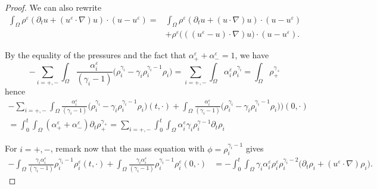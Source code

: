 \documentclass[11pt, twoside, a4paper]{article}
\theoremstyle{plain}
\theoremstyle{remark}
\numberwithin{equation}{section}
\renewcommand{\epsilon}{\varepsilon}
\newcommand{\eps}{\varepsilon}
\begin{document}
\begin{appendices}
\begin{proof}
We can also rewrite 
\begin{align*}
 \int_{\Omega} \rho^\eps (\partial_t u + (u^{\epsilon} \cdot \nabla) u)\cdot (u-u^{\epsilon})
 =& \int_{\Omega} \rho^\eps (\partial_t u + (u \cdot \nabla) u)\cdot (u-u^{\epsilon}) \\
 &+ \rho^\eps \Big(((u^{\epsilon}-u)\cdot \nabla) u \Big)\cdot (u-u^{\epsilon}).
\end{align*}

By the equality of the pressures and the fact that $\alpha_+^\eps+\alpha_-^\eps=1$, we have
\begin{equation*}
 -\sum_{i=+,-} \int_{\Omega} \frac{\alpha_i^{\epsilon}}{(\gamma_i -1)} \Big(\rho_i^{\gamma_i} - \gamma_i \rho_i^{\gamma_i-1}\rho_i \Big)
 = \sum_{i=+,-}\int_{\Omega} \alpha_i^{\epsilon}\rho_i^{\gamma_i} 
 = \int_{\Omega} \rho_+^{\gamma_+} 
\end{equation*}
hence
\begin{multline*}
 - \sum_{i=+,-} \int_{\Omega} \frac{\alpha_i^{\epsilon}}{(\gamma_i -1)} \Big(\rho_i^{\gamma_i} - \gamma_i \rho_i^{\gamma_i-1}\rho_i \Big)(t,\cdot) + \int_{\Omega} \frac{\alpha_i^{\epsilon}}{(\gamma_i -1)} \Big(\rho_i^{\gamma_i} - \gamma_i \rho_i^{\gamma_i-1}\rho_i) \Big)(0,\cdot) \\
 =\int_0^t\!\!\!\int_\Omega (\alpha_+^\eps+\alpha_-^\eps)\partial_t \rho_+^{\gamma_+} 
 =\sum_{i=+,-}\int_0^t\!\!\!\int_\Omega \alpha_i^\eps \gamma_i \rho_i^{\gamma-1} \partial_t \rho_i 
\end{multline*}



For $i=+,-$, remark now that the mass equation with $\phi = \rho_i^{\gamma_i-1}$ gives
\begin{align*}
 -\int_{\Omega} \frac{\gamma_i \alpha_i^{\epsilon}}{(\gamma_i -1)} \rho_i^{\gamma_i-1}\rho_i^{\epsilon} (t,\cdot) +\int_{\Omega} \frac{\gamma_i\alpha_i^{\epsilon}}{(\gamma_i -1)} \rho_i^{\gamma_i-1}\rho_i^{\epsilon} (0,\cdot)
 & =- \int_0^t\!\!\!\int_\Omega \gamma_i\alpha_{i}^\eps\rho_{i}^\eps\rho_i^{\gamma_i-2} \Big(\partial_t \rho_i + (u^{\epsilon} \cdot \nabla) \rho_i\Big).
\end{align*}



\end{proof}
\end{appendices}
\end{document}
